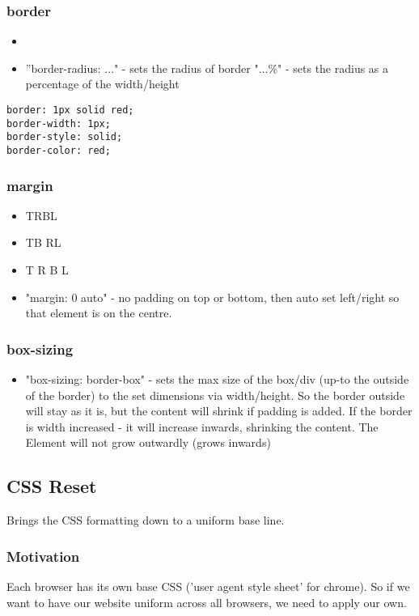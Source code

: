 \documentclass[]{article}
\begin{document}
\subsubsection{border}
\begin{itemize}
	\item
	\item ''border-radius: ..." - sets the radius of border
	\subitem "...\%" - sets the radius as a percentage of the width/height
\end{itemize}
\begin{lstlisting}
border: 1px solid red;
border-width: 1px;
border-style: solid;
border-color: red;
\end{lstlisting}

\subsubsection{margin}
\begin{itemize}
	\item TRBL
	\item TB RL
	\item T R B L
	\item "margin: 0 auto" - no padding on top or bottom, then auto set left/right so that element is on the centre.
\end{itemize}

\subsubsection{box-sizing}
\begin{itemize}
	\item "box-sizing: border-box" - sets the max size of the box/div (up-to the outside of the border) to the set dimensions via width/height.  So the border outside will stay as it is, but the content will shrink if padding is added.  If the border is width increased - it will increase inwards, shrinking the content.  The Element will not grow outwardly (grows inwards) 
\end{itemize}

\subsection{CSS Reset}
Brings the CSS formatting down to a uniform base line.
\subsubsection{Motivation}
Each browser has its own base CSS ('user agent style sheet'  for chrome).  So if we want to have our website uniform across all browsers, we need to apply our own.
\end{document}

